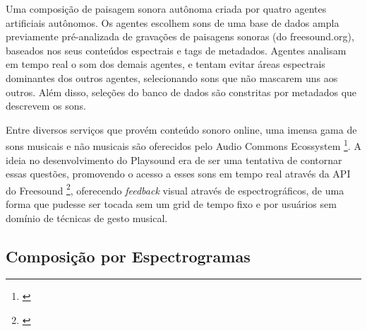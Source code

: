 \begin{citacao}
Uma composição de paisagem sonora autônoma criada por quatro agentes artificiais autônomos. Os agentes escolhem sons de uma base de dados ampla previamente pré-analizada de gravações de paisagens sonoras (do freesound.org), baseados nos seus conteúdos espectrais e tags de metadados. Agentes analisam em tempo real o som dos demais agentes, e tentam evitar áreas espectrais dominantes dos outros agentes, selecionando sons que não mascarem uns aos outros. Além disso, seleções do banco de dados são constritas por metadados que descrevem os sons. \cite{Arneeigenfeldt2010}

\end{citacao}

Entre diversos serviços que provém conteúdo sonoro online, uma imensa gama de sons musicais e não musicais são oferecidos pelo Audio Commons Ecossystem \footnote{\cite{Font2015}}. A ideia no desenvolvimento do Playsound era de ser uma tentativa de contornar essas questões, promovendo o acesso a esses sons em tempo real através da API do Freesound \footnote{\cite{Akkermans2011}}, oferecendo \emph{feedback} visual através de espectrográficos, de uma forma que pudesse ser tocada sem um grid de tempo fixo e por usuários sem domínio de técnicas de gesto musical.


\subsection{Composição por Espectrogramas}

